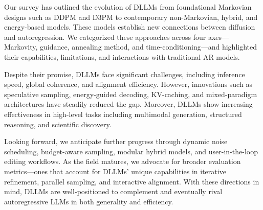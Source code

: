 Our survey has outlined the evolution of DLLMs from foundational Markovian designs such as DDPM and D3PM to contemporary non-Markovian, hybrid, and energy-based models. These models establish new connections between diffusion and autoregression. We categorized these approaches across four axes—Markovity, guidance, annealing method, and time-conditioning—and highlighted their capabilities, limitations, and interactions with traditional AR models.

Despite their promise, DLLMs face significant challenges, including inference speed, global coherence, and alignment efficiency. However, innovations such as speculative sampling, energy-guided decoding, KV-caching, and mixed-paradigm architectures have steadily reduced the gap. Moreover, DLLMs show increasing effectiveness in high-level tasks including multimodal generation, structured reasoning, and scientific discovery.

Looking forward, we anticipate further progress through dynamic noise scheduling, budget-aware sampling, modular hybrid models, and user-in-the-loop editing workflows. As the field matures, we advocate for broader evaluation metrics—ones that account for DLLMs’ unique capabilities in iterative refinement, parallel sampling, and interactive alignment. With these directions in mind, DLLMs are well-positioned to complement and eventually rival autoregressive LLMs in both generality and efficiency.

